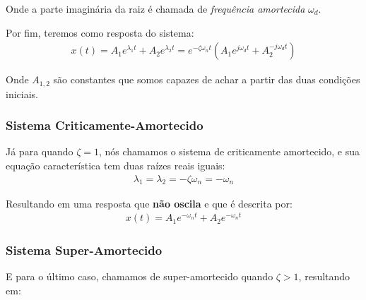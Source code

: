 \documentclass{article}
\begin{document}
                    Onde a parte imaginária da raiz é chamada de \emph{frequência amortecida} $\omega_d$. 

                    Por fim, teremos como resposta do sistema:
                    \begin{align}
                        x(t) = A_1 e^{\lambda_1 t} + A_2 e^{\lambda_2 t} = e^{-\zeta \omega_n t}(A_1e^{j\omega_dt} + A_2^{-j\omega_d t}) \label{eq:resp_sis_sub_amortecido}
                    \end{align}

                    Onde $A_{1,2}$ são constantes que somos capazes de achar a partir das duas condições iniciais.

                \subsubsection{Sistema Criticamente-Amortecido}
                    Já para quando $\zeta=1$, nós chamamos o sistema de criticamente amortecido, e sua equação característica tem duas raízes reais iguais:
                    \begin{align}
                        \lambda_1 = \lambda_2 = -\zeta \omega_n = -\omega_n \label{eq:raizes_caso_criticamente_amortecido}
                    \end{align}

                     Resultando em uma resposta que \textbf{não oscila} e que é descrita por:
                     \begin{align}
                        x(t) = A_1 e^{-\omega_n t}  + A_2 e^{-\omega_n t}
                     \end{align}

                \subsubsection{Sistema Super-Amortecido}
                     E para o último caso, chamamos de super-amortecido quando $\zeta > 1$, resultando em:






            
\end{document}
